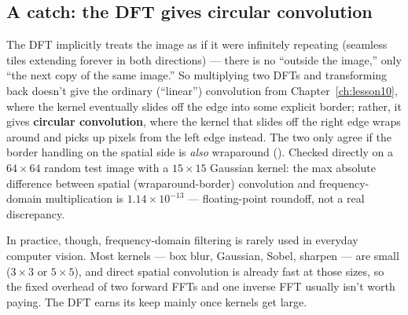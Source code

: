 \subsection*{A catch: the DFT gives circular convolution}

The DFT implicitly treats the image as if it were infinitely repeating (seamless tiles extending forever in both directions) --- there is no ``outside the image,'' only ``the next copy of the same image.'' So multiplying two DFTs and transforming back doesn't give the ordinary (``linear'') convolution from Chapter~\ref{ch:lesson10}, where the kernel eventually slides off the edge into some explicit border; rather, it gives \textbf{circular convolution}, where the kernel that slides off the right edge wraps around and picks up pixels from the left edge instead. The two only agree if the border handling on the spatial side is \emph{also} wraparound (). Checked directly on a $64\times64$ random test image with a $15\times15$ Gaussian kernel: the max absolute difference between spatial (wraparound-border) convolution and frequency-domain multiplication is $1.14\times10^{-13}$ --- floating-point roundoff, not a real discrepancy.

In practice, though, frequency-domain filtering is rarely used in everyday computer vision. Most kernels --- box blur, Gaussian, Sobel, sharpen --- are small ($3\times3$ or $5\times5$), and direct spatial convolution is already fast at those sizes, so the fixed overhead of two forward FFTs and one inverse FFT usually isn't worth paying. The DFT earns its keep mainly once kernels get large.

